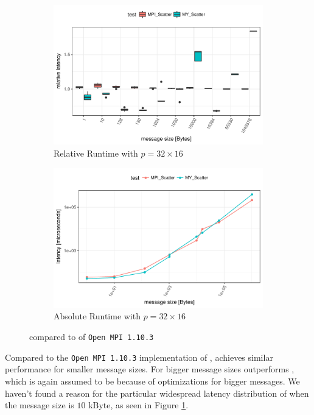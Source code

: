 \begin{figure}[H]
    \begin{subfigure}[b]{0.49\textwidth}
        \includegraphics[width=\textwidth]{../benchmarks/openmpi/divide_conquer/scatter_32/rel_runtime.pdf}
        \caption{Relative Runtime with $p=32 \times 16$}
        \label{fig:Scatter:OpenMPI:Rel:32}
    \end{subfigure}
    \begin{subfigure}[b]{0.49\textwidth}
        \includegraphics[width=\textwidth]{../benchmarks/openmpi/divide_conquer/scatter_32/runtime.pdf}
        \caption{Absolute Runtime with $p=32 \times 16$}
        \label{fig:Scatter:OpenMPI:Abs:32}
    \end{subfigure}
    
    \caption{\myscatter compared to \mpiscatter of \texttt{Open MPI 1.10.3}}
\end{figure}

Compared to the \texttt{Open MPI 1.10.3} implementation of \mpiscatter, \myscatter achieves similar performance for smaller message sizes. 
For bigger message sizes \mpiscatter outperforms \myscatter, which is again assumed to be because of optimizations for bigger messages.
We haven't found a reason for the particular widespread latency distribution of \myscatter when the message size is $10$ kByte, as seen in Figure \ref{fig:Scatter:OpenMPI:Rel:32}. 


